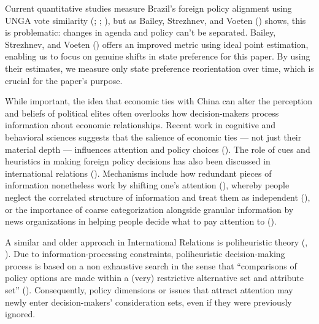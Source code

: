 \documentclass[
  12pt,
]{article}
\begin{document}
Current quantitative studies measure Brazil's foreign policy alignment
using UNGA vote similarity (;
;
), but as
Bailey, Strezhnev, and Voeten ()
shows, this is problematic: changes in agenda and policy can't be
separated. Bailey, Strezhnev, and Voeten
() offers an improved metric using
ideal point estimation, enabling us to focus on genuine shifts in state
preference for this paper. By using their estimates, we measure only
state preference reorientation over time, which is crucial for the
paper's purpose.

While important, the idea that economic ties with China can alter the
perception and beliefs of political elites often overlooks how
decision-makers process information about economic relationships. Recent
work in cognitive and behavioral sciences suggests that the salience of
economic ties --- not just their material depth --- influences attention
and policy choices (). The role of
cues and heuristics in making foreign policy decisions has also been
discussed in international relations
().
Mechanisms include how redundant pieces of information nonetheless work
by shifting one's attention (),
whereby people neglect the correlated structure of information and treat
them as independent (), or the importance of coarse categorization alongside
granular information by news organizations in helping people decide what
to pay attention to ().

A similar and older approach in International Relations is poliheuristic
theory (,
). Due to information-processing
constraints, poliheuristic decision-making process is based on a non
exhaustive search in the sense that ``comparisons of policy options are
made within a (very) restrictive alternative set and attribute set''
(). Consequently,
policy dimensions or issues that attract attention may newly enter
decision-makers' consideration sets, even if they were previously
ignored.
\end{document}
